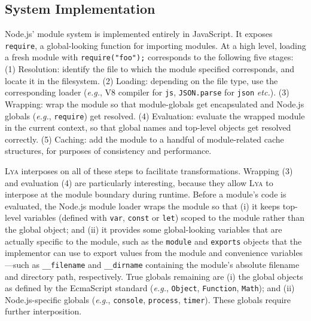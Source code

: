 \documentclass[letterpaper,twocolumn,10pt]{article}
\def\eg{{\em e.g.}, }
\def\etc{{\em etc.}\xspace}
\newcommand{\ttt}[1]{\texttt{#1}}
\newcommand{\sx}[1]{(\S\ref{#1})}
\newcommand{\sys}{{\scshape Lya}\xspace}
\begin{document}

\subsection{System Implementation}
\label{impl1}


Node.js' module system is implemented entirely in JavaScript.
It exposes \ttt{require}, a global-looking function for importing modules.
At a high level, loading a fresh module with \ttt{require("foo");} corresponds to the following five stages:
(1) Resolution: identify the file to which the module specified corresponds, and locate it in the filesystem.
(2) Loading: depending on the file type, use the corresponding loader (\eg V8 compiler for \ttt{js}, \ttt{JSON.parse} for \ttt{json} \etc).
(3) Wrapping: wrap the module so that module-globals get encapsulated and Node.js globals (\eg \ttt{require}) get resolved.
(4) Evaluation: evaluate the wrapped module in the current context, so that global names and top-level objects get resolved correctly.
(5) Caching: add the module to a handful of module-related cache structures, for purposes of consistency and performance.

\sys interposes on all of these steps to facilitate transformations.
Wrapping (3) and evaluation (4) are particularly interesting, because they allow \sys to interpose at the module boundary during runtime.
Before a module's code is evaluated, the Node.js module loader wraps the module so that
  (i) it keeps top-level variables (defined with \ttt{var}, \ttt{const} or \ttt{let}) scoped to the module rather than the global object; and
  (ii) it provides some global-looking variables that are actually specific to the module, such as the \ttt{module} and \ttt{exports} objects that the implementor can use to export values from the module and convenience variables---such as \ttt{\_\_filename} and \ttt{\_\_dirname}  containing the module's absolute filename and directory path, respectively.
True globals remaining are
  (i) the global objects as defined by the EcmaScript standard (\eg \ttt{Object}, \ttt{Function}, \ttt{Math}); and
  (ii) Node.js-specific globals (\eg \ttt{console}, \ttt{process}, \ttt{timer}).
These globals require further interposition.
\end{document}
